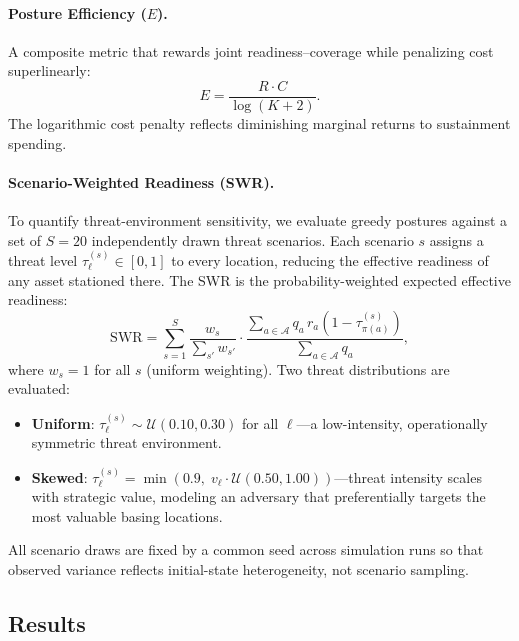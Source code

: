 \documentclass[11pt]{article}
\begin{document}
\paragraph{Posture Efficiency ($E$).}
A composite metric that rewards joint readiness--coverage while penalizing
cost superlinearly:
\begin{equation}
    E = \frac{R \cdot C}{\log(K + 2)}.
    \label{eq:efficiency}
\end{equation}
The logarithmic cost penalty reflects diminishing marginal returns to
sustainment spending.

\paragraph{Scenario-Weighted Readiness (SWR).}
To quantify threat-environment sensitivity, we evaluate greedy postures
against a set of $S = 20$ independently drawn threat scenarios. Each
scenario $s$ assigns a threat level $\tau_\ell^{(s)} \in [0,1]$ to every
location, reducing the effective readiness of any asset stationed there.
The SWR is the probability-weighted expected effective readiness:
\begin{equation}
    \mathrm{SWR} = \sum_{s=1}^{S} \frac{w_s}{\sum_{s'} w_{s'}}
    \cdot \frac{\sum_{a \in \mathcal{A}} q_a \, r_a
    \left(1 - \tau_{\pi(a)}^{(s)}\right)}{\sum_{a \in \mathcal{A}} q_a},
    \label{eq:swr}
\end{equation}
where $w_s = 1$ for all $s$ (uniform weighting).
Two threat distributions are evaluated:
\begin{itemize}
    \item \textbf{Uniform}: $\tau_\ell^{(s)} \sim \mathcal{U}(0.10, 0.30)$
          for all $\ell$---a low-intensity, operationally symmetric threat
          environment.
    \item \textbf{Skewed}: $\tau_\ell^{(s)} = \min\!\left(0.9,\;
          v_\ell \cdot \mathcal{U}(0.50, 1.00)\right)$---threat intensity
          scales with strategic value, modeling an adversary that preferentially
          targets the most valuable basing locations.
\end{itemize}
All scenario draws are fixed by a common seed across simulation runs so
that observed variance reflects initial-state heterogeneity, not
scenario sampling.

\subsection{Results}
\label{sec:exp1:results}
\end{document}
